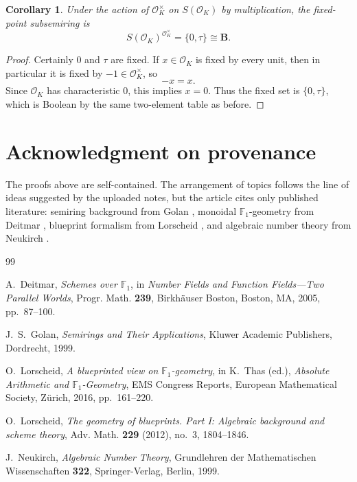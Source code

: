 \documentclass[11pt]{article}
\newtheorem{corollary}[theorem]{Corollary}
\theoremstyle{definition}
\newcommand{\B}{\mathbf B}
\newcommand{\taup}{\tau}
\newcommand{\OK}{\mathcal O_K}
\begin{document}
\begin{corollary}\label{cor:OK-fixed}
Under the action of \(\OK^{\times}\) on \(S(\OK)\) by multiplication, the fixed-point subsemiring is
\[
S(\OK)^{\OK^{\times}}=\{0,\taup\}\cong\B.
\]
\end{corollary}

\begin{proof}
Certainly \(0\) and \(\taup\) are fixed.  If \(x\in\OK\) is fixed by every unit, then in particular it is fixed by \(-1\in \OK^{\times}\), so
\[
-x=x.
\]
Since \(\OK\) has characteristic \(0\), this implies \(x=0\).  Thus the fixed set is \(\{0,\taup\}\), which is Boolean by the same two-element table as before.
\end{proof}

\section*{Acknowledgment on provenance}
The proofs above are self-contained.  The arrangement of topics follows the line of ideas suggested by the uploaded notes, but the article cites only published literature: semiring background from Golan \cite{golan}, monoidal \(\mathbb F_1\)-geometry from Deitmar \cite{deitmar}, blueprint formalism from Lorscheid \cite{lorscheidview,lorscheid}, and algebraic number theory from Neukirch \cite{neukirch}.

\begin{thebibliography}{99}

A.~Deitmar,
\emph{Schemes over \(\mathbb F_1\)},
in \emph{Number Fields and Function Fields---Two Parallel Worlds},
Progr. Math. \textbf{239}, Birkh\"auser Boston, Boston, MA, 2005, pp.~87--100.

J.~S.~Golan,
\emph{Semirings and Their Applications},
Kluwer Academic Publishers, Dordrecht, 1999.

O.~Lorscheid,
\emph{A blueprinted view on \(\mathbb F_1\)-geometry},
in K.~Thas (ed.), \emph{Absolute Arithmetic and \(\mathbb F_1\)-Geometry},
EMS Congress Reports, European Mathematical Society, Z\"urich, 2016, pp.~161--220.

O.~Lorscheid,
\emph{The geometry of blueprints. Part I: Algebraic background and scheme theory},
Adv. Math. \textbf{229} (2012), no.~3, 1804--1846.

J.~Neukirch,
\emph{Algebraic Number Theory},
Grundlehren der Mathematischen Wissenschaften \textbf{322}, Springer-Verlag, Berlin, 1999.

\end{thebibliography}
\end{document}
